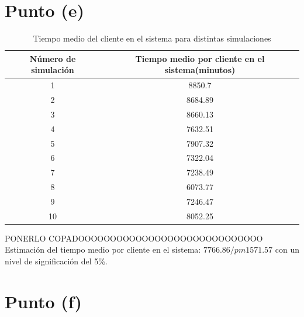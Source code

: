 \documentclass[a4paper,10pt]{article}
\begin{document}
\section{Punto (e)}

\begin{table}
\centering
\begin{tabular}{|c|c|}
\hline
  N\'umero de simulaci\'on & Tiempo medio por cliente en el sistema(minutos) \\
\hline
  1 & 8850.7 \\
\hline
  2 & 8684.89 \\
\hline
  3 & 8660.13 \\
\hline
  4 & 7632.51 \\
\hline
  5 & 7907.32 \\
\hline
  6 & 7322.04 \\
\hline
  7 & 7238.49 \\
\hline
  8 & 6073.77 \\
\hline
  9 & 7246.47 \\
\hline
  10 & 8052.25 \\
\hline
\end{tabular}
\caption{\label{tab:mean_sistem_time} Tiempo medio del cliente en el sistema para distintas simulaciones}
\end{table} 

PONERLO COPADOOOOOOOOOOOOOOOOOOOOOOOOOOOOO
Estimaci\'on del tiempo medio por cliente en el sistema: $7766.86 /pm 1571.57$ con un nivel de significaci\'on del 5\%.


\section{Punto (f)}
\end{document}
